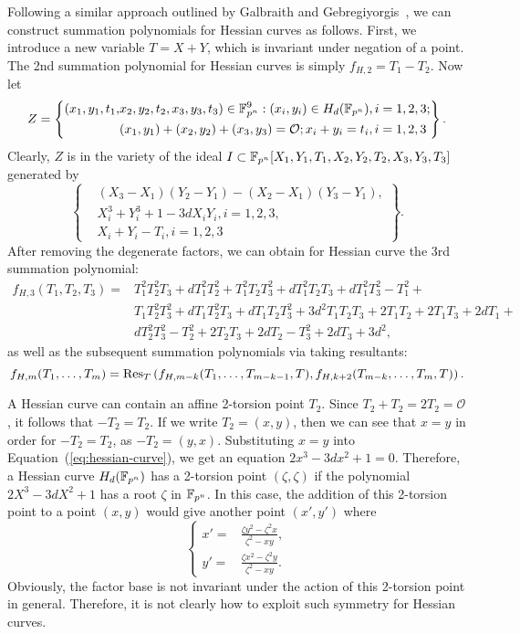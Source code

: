 Following a similar approach outlined by Galbraith and
Gebregiyorgis~\cite{DBLP:conf/indocrypt/GalbraithG14}, we can
construct summation polynomials for Hessian curves as follows.
%
First, we introduce a new variable $T=X+Y$, which is invariant under
negation of a point.
%
The 2nd summation polynomial for Hessian curves is simply
$f_{H,2} = T_1 - T_2$.
%
Now let
\[ Z=\left\{\begin{aligned}
      (x_1,y_1,t_1,&x_2,y_2,t_2,x_3,y_3,t_3)\in\mathbb F_{p^n}^9:(x_i,y_i)\in H_d(\mathbb F_{p^n}),i=1,2,3; \\
      & (x_1,y_1)+(x_2,y_2)+(x_3,y_3)=\mathcal O; x_i+y_i=t_i,i=1,2,3
    \end{aligned} \right\}. \]
%
Clearly, $Z$ is in the variety of the ideal
$I\subset\mathbb F_{p^n}[X_1,Y_1,T_1,X_2,Y_2,T_2,X_3,Y_3,T_3]$ generated by
\[ \left\{\begin{aligned}
      &  (X_3 - X_1)(Y_2 - Y_1) - (X_2 - X_1)(Y_3 - Y_1), \\
      & X_i^3 + Y_i^3 + 1 - 3dX_iY_i,i=1,2,3, \\
      & X_i + Y_i - T_i,i=1,2,3
    \end{aligned}\right\}. \]
%
After removing the degenerate factors, we can obtain for Hessian curve
the 3rd summation polynomial:
\begin{align*}
  f_{H,3}(T_1,T_2,T_3) = & T_1^2T_2^2T_3 + dT_1^2T_2^2 + T_1^2T_2T_3^2
                           + dT_1^2T_2T_3 + dT_1^2T_3^2 - T_1^2 + \\
                         & T_1T_2^2T_3^2 + dT_1T_2^2T_3 + dT_1T_2T_3^2
                           + 3d^2T_1T_2T_3 + 2T_1T_2 + 2T_1T_3 + 2dT_1
                           + \\
                         & dT_2^2T_3^2 - T_2^2 + 2T_2T_3 + 2dT_2 - T_3^2 + 2dT_3 + 3d^2,
\end{align*}
%
as well as the subsequent summation polynomials via taking resultants:
\[ f_{H,m}(T_1,\ldots,T_m) =
  \operatorname{Res}_T\left(f_{H,m-k}(T_1,\ldots,T_{m-k-1},T),f_{H,k+2}(T_{m-k},\ldots,T_m,T)\right). \]

A Hessian curve can contain an affine 2-torsion point $T_2$.
%
Since $T_2+T_2=2T_2=\mathcal O$, it follows that $-T_2=T_2$.
%
If we write $T_2=(x,y)$, then we can see that $x=y$ in order for
$-T_2=T_2$, as $-T_2=(y,x)$.
%
Substituting $x=y$ into Equation~(\ref{eq:hessian-curve}), we get an
equation $2x^3-3dx^2+1=0$.
%
Therefore, a Hessian curve $H_d(\mathbb F_{p^n})$ has a 2-torsion point
$(\zeta,\zeta)$ if the polynomial $2X^3 - 3dX^2 + 1$ has a root
$\zeta$ in $\mathbb F_{p^n}$.
%
In this case, the addition of this 2-torsion point to a point $(x,y)$
would give another point $(x',y')$ where
\[ \left\{\begin{aligned}
x' = & \frac{\zeta y^2 - \zeta^2x}{\zeta^2 - xy}, \\
y' = & \frac{\zeta x^2 - \zeta^2y}{\zeta^2 - xy}.
\end{aligned}\right. \]
%
Obviously, the factor base is not invariant under the action of this
2-torsion point in general.
%
Therefore, it is not clearly how to exploit such symmetry for Hessian
curves.

